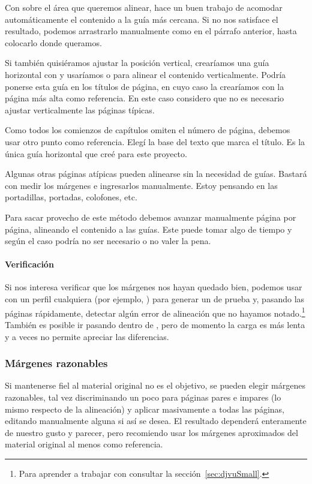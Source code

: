 \documentclass[%
	a5paper,
	10pt,
	twoside,
	openright,
	final,
]{memoir}
\begin{document}
	Con \keys{\shift + \,\leftclick\,\leftclick} sobre el área que queremos alinear, \scantailor hace un buen trabajo de acomodar automáticamente el contenido a la guía más cercana. Si no nos satisface el resultado, podemos arrastrarlo manualmente como en el párrafo anterior, hasta colocarlo donde queramos.

	Si también quisiéramos ajustar la posición vertical, crearíamos una guía horizontal con  y usaríamos \keys{\ctrl + \,\leftclick\,\leftclick} o  para alinear el contenido verticalmente. Podría ponerse esta guía en los títulos de página, en cuyo caso la crearíamos con la página más alta como referencia. En este caso considero que no es necesario ajustar verticalmente las páginas típicas.

	Como todos los comienzos de capítulos omiten el número de página, debemos usar otro punto como referencia. Elegí la base del texto que marca el título. Es la única guía horizontal que creé para este proyecto.

	Algunas otras páginas atípicas pueden alinearse sin la necesidad de guías. Bastará con medir los márgenes e ingresarlos manualmente. Estoy pensando en las portadillas, portadas, colofones, etc.

	Para sacar provecho de este método debemos avanzar manualmente página por página, alineando el contenido a las guías. Este puede tomar algo de tiempo y según el caso podría no ser necesario o no valer la pena.

	\paragraph{Verificación} Si nos interesa verificar que los márgenes nos hayan quedado bien, podemos usar \djvusmall con un perfil cualquiera (por ejemplo, ) para generar un \djvu de prueba y, pasando las páginas rápidamente, detectar algún error de alineación que no hayamos notado.\footnote{Para aprender a trabajar con \djvusmall consultar la sección~\ref{sec:djvuSmall}.} También es posible ir pasando dentro de \scantailor, pero de momento la carga es más lenta y a veces no permite apreciar las diferencias.

	\subsubsection{Márgenes razonables\label{sec:STmarginsReasonables}} Si mantenerse fiel al material original no es el objetivo, se pueden elegir márgenes razonables, tal vez discriminando un poco para páginas pares e impares (lo mismo respecto de la alineación) y aplicar masivamente a todas las páginas, editando manualmente alguna si así se desea. El resultado dependerá enteramente de nuestro gusto y parecer, pero recomiendo usar los márgenes aproximados del material original al menos como referencia.
\end{document}
